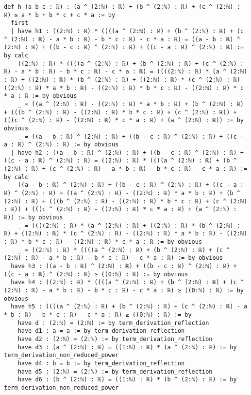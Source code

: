 \documentclass{article}
\begin{document}
\begin{tcolorbox}[colback=white!10, width=\linewidth]
\begin{lstlisting}[language=Lean4]
def h (a b c : ℝ) : (a ^ (2:ℕ) : ℝ) + (b ^ (2:ℕ) : ℝ) + (c ^ (2:ℕ) : ℝ) ≥ a * b + b * c + c * a := by
  first
  | have h1 : ((2:ℕ) : ℝ) * ((((a ^ (2:ℕ) : ℝ) + (b ^ (2:ℕ) : ℝ) + (c ^ (2:ℕ) : ℝ) - a * b : ℝ) - b * c : ℝ) - c * a : ℝ) = ((a - b : ℝ) ^ (2:ℕ) : ℝ) + ((b - c : ℝ) ^ (2:ℕ) : ℝ) + ((c - a : ℝ) ^ (2:ℕ) : ℝ) := by calc
    ((2:ℕ) : ℝ) * ((((a ^ (2:ℕ) : ℝ) + (b ^ (2:ℕ) : ℝ) + (c ^ (2:ℕ) : ℝ) - a * b : ℝ) - b * c : ℝ) - c * a : ℝ) = ((((2:ℕ) : ℝ) * (a ^ (2:ℕ) : ℝ) + ((2:ℕ) : ℝ) * (b ^ (2:ℕ) : ℝ) + ((2:ℕ) : ℝ) * (c ^ (2:ℕ) : ℝ) - ((2:ℕ) : ℝ) * a * b : ℝ) - ((2:ℕ) : ℝ) * b * c : ℝ) - ((2:ℕ) : ℝ) * c * a : ℝ := by obvious
    _ = ((a ^ (2:ℕ) : ℝ) - ((2:ℕ) : ℝ) * a * b : ℝ) + (b ^ (2:ℕ) : ℝ) + (((b ^ (2:ℕ) : ℝ) - ((2:ℕ) : ℝ) * b * c : ℝ) + (c ^ (2:ℕ) : ℝ)) + (((c ^ (2:ℕ) : ℝ) - ((2:ℕ) : ℝ) * c * a : ℝ) + (a ^ (2:ℕ) : ℝ)) := by obvious
    _ = ((a - b : ℝ) ^ (2:ℕ) : ℝ) + ((b - c : ℝ) ^ (2:ℕ) : ℝ) + ((c - a : ℝ) ^ (2:ℕ) : ℝ) := by obvious
  | have h2 : ((a - b : ℝ) ^ (2:ℕ) : ℝ) + ((b - c : ℝ) ^ (2:ℕ) : ℝ) + ((c - a : ℝ) ^ (2:ℕ) : ℝ) = ((2:ℕ) : ℝ) * ((((a ^ (2:ℕ) : ℝ) + (b ^ (2:ℕ) : ℝ) + (c ^ (2:ℕ) : ℝ) - a * b : ℝ) - b * c : ℝ) - c * a : ℝ) := by calc
    ((a - b : ℝ) ^ (2:ℕ) : ℝ) + ((b - c : ℝ) ^ (2:ℕ) : ℝ) + ((c - a : ℝ) ^ (2:ℕ) : ℝ) = ((a ^ (2:ℕ) : ℝ) - ((2:ℕ) : ℝ) * a * b : ℝ) + (b ^ (2:ℕ) : ℝ) + (((b ^ (2:ℕ) : ℝ) - ((2:ℕ) : ℝ) * b * c : ℝ) + (c ^ (2:ℕ) : ℝ)) + (((c ^ (2:ℕ) : ℝ) - ((2:ℕ) : ℝ) * c * a : ℝ) + (a ^ (2:ℕ) : ℝ)) := by obvious
    _ = ((((2:ℕ) : ℝ) * (a ^ (2:ℕ) : ℝ) + ((2:ℕ) : ℝ) * (b ^ (2:ℕ) : ℝ) + ((2:ℕ) : ℝ) * (c ^ (2:ℕ) : ℝ) - ((2:ℕ) : ℝ) * a * b : ℝ) - ((2:ℕ) : ℝ) * b * c : ℝ) - ((2:ℕ) : ℝ) * c * a : ℝ := by obvious
    _ = ((2:ℕ) : ℝ) * ((((a ^ (2:ℕ) : ℝ) + (b ^ (2:ℕ) : ℝ) + (c ^ (2:ℕ) : ℝ) - a * b : ℝ) - b * c : ℝ) - c * a : ℝ) := by obvious
  have h3 : ((a - b : ℝ) ^ (2:ℕ) : ℝ) + ((b - c : ℝ) ^ (2:ℕ) : ℝ) + ((c - a : ℝ) ^ (2:ℕ) : ℝ) ≥ ((0:ℕ) : ℝ) := by obvious
  have h4 : ((2:ℕ) : ℝ) * ((((a ^ (2:ℕ) : ℝ) + (b ^ (2:ℕ) : ℝ) + (c ^ (2:ℕ) : ℝ) - a * b : ℝ) - b * c : ℝ) - c * a : ℝ) ≥ ((0:ℕ) : ℝ) := by obvious
  have h5 : ((((a ^ (2:ℕ) : ℝ) + (b ^ (2:ℕ) : ℝ) + (c ^ (2:ℕ) : ℝ) - a * b : ℝ) - b * c : ℝ) - c * a : ℝ) ≥ ((0:ℕ) : ℝ) := by
    have d : (2:ℕ) = (2:ℕ) := by term_derivation_reflection
    have d1 : a = a := by term_derivation_reflection
    have d2 : (2:ℕ) = (2:ℕ) := by term_derivation_reflection
    have d3 : (a ^ (2:ℕ) : ℝ) = ((1:ℕ) : ℝ) * (a ^ (2:ℕ) : ℝ) := by term_derivation_non_reduced_power
    have d4 : b = b := by term_derivation_reflection
    have d5 : (2:ℕ) = (2:ℕ) := by term_derivation_reflection
    have d6 : (b ^ (2:ℕ) : ℝ) = ((1:ℕ) : ℝ) * (b ^ (2:ℕ) : ℝ) := by term_derivation_non_reduced_power

\end{lstlisting}
\end{tcolorbox}
\end{document}
